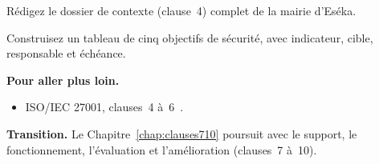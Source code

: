 \begin{boxexo}[title={\ding{45}\quad Exercice~8.9. Dossier de contexte \niveauexpert}]
Rédigez le dossier de contexte (clause~4) complet de la mairie d'Eséka.
\end{boxexo}

\begin{boxexo}[title={\ding{45}\quad Exercice~8.10. Plan d'objectifs \niveauexpert}]
Construisez un tableau de cinq objectifs de sécurité, avec indicateur, cible,
responsable et échéance.
\end{boxexo}

\bigskip

\begin{boxinfo}
\textbf{Pour aller plus loin.}
\begin{itemize}
    \item ISO/IEC 27001, clauses~4 à~6~\cite{iso27001}.
\end{itemize}
\end{boxinfo}

\begin{boxinfo}
\textbf{Transition.} Le Chapitre~\ref{chap:clauses710} poursuit avec le support,
le fonctionnement, l'évaluation et l'amélioration (clauses~7 à~10).
\end{boxinfo}
